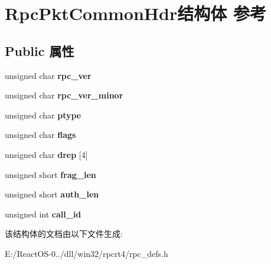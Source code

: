 \hypertarget{struct_rpc_pkt_common_hdr}{}\section{Rpc\+Pkt\+Common\+Hdr结构体 参考}
\label{struct_rpc_pkt_common_hdr}
\subsection*{Public 属性}
\begin{DoxyCompactItemize}
\item 
\mbox{\label{struct_rpc_pkt_common_hdr_a4306d441d76624896502d4cf96dac32a}} 
unsigned char {\bfseries rpc\+\_\+ver}
\item 
\mbox{\label{struct_rpc_pkt_common_hdr_a0cf8dd26c5a2cdfd5b51eda0e06f0f73}} 
unsigned char {\bfseries rpc\+\_\+ver\+\_\+minor}
\item 
\mbox{\label{struct_rpc_pkt_common_hdr_a1683440461aa2f54f3ead5d2c81103a8}} 
unsigned char {\bfseries ptype}
\item 
\mbox{\label{struct_rpc_pkt_common_hdr_a28cc9978532fd6966b2848a129b81526}} 
unsigned char {\bfseries flags}
\item 
\mbox{\label{struct_rpc_pkt_common_hdr_a0da1eeacc7b6f767d6467851bb2cb020}} 
unsigned char {\bfseries drep} \mbox{[}4\mbox{]}
\item 
\mbox{\label{struct_rpc_pkt_common_hdr_add2ad9c05ae2b33dd75185e3af9e062e}} 
unsigned short {\bfseries frag\+\_\+len}
\item 
\mbox{\label{struct_rpc_pkt_common_hdr_a82cbe5756928fa795ac2d1faa5c23bda}} 
unsigned short {\bfseries auth\+\_\+len}
\item 
\mbox{\label{struct_rpc_pkt_common_hdr_a5c14527d36821bb5dbbe8b618c6c495c}} 
unsigned int {\bfseries call\+\_\+id}
\end{DoxyCompactItemize}


该结构体的文档由以下文件生成\+:\begin{DoxyCompactItemize}
\item 
E\+:/\+React\+O\+S-\/0../dll/win32/rpcrt4/rpc\+\_\+defs.\+h\end{DoxyCompactItemize}
